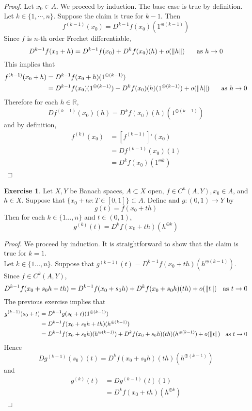 \documentclass[12pt]{amsart}
\theoremstyle{definition}
\newtheorem{ex}[definition]{Exercise}
\newcommand{\R}{\mathbb{R}}
\begin{document}
	\begin{proof}
	Let $x_0 \in A$. We proceed by induction. The base case is true by definition. Let $k \in \{1, \cdots, n\}$. Suppose the claim is true for $k-1$. Then $$f^{(k-1)}(x_0) = D^{k-1}f(x_0)(1^{\oplus (k-1)})$$
	Since $f$ is $n$-th order Frechet differentiable, $$D^{k-1}f(x_0+h) = D^{k-1}f(x_0) + D^kf(x_0)(h) + o(\|h\|) \hspace{.5cm} \text{ as } h \rightarrow 0$$ 
	This implies that 
	\begin{align*}
	f^{(k-1)}(x_0+h) 
	&=  D^{k-1}f(x_0+h)(1^{\oplus (k-1)}) \\
	&= D^{k-1}f(x_0)(1^{\oplus (k-1)}) + D^kf(x_0)(h)(1^{\oplus (k-1)}) + o(\|h\|) \hspace{.5cm} \text{ as } h \rightarrow 0
	\end{align*}
	Therefore for each $h \in \R$, $$Df^{(k-1)}(x_0)(h) = D^kf(x_0)(h)(1^{\oplus (k-1)})$$
	and by definition,
	\begin{align*}
	f^{(k)}(x_0) 
	&= [f^{(k-1)}]'(x_0) \\
	&= Df^{(k-1)}(x_0)(1) \\
	&=  D^kf(x_0)(1^{\oplus k})
	\end{align*}
	\end{proof}
	
	
	
	
	\begin{ex}
	Let $X,Y$ be Banach spaces, $A \subset X$ open, $f \in C^n(A, Y), x_0 \in A$, and $h \in X$. Suppose that $\{x_0 +tx:T \in [0,1]\} \subset A$. Define and $g:(0,1) \rightarrow Y$ by $$g(t) = f(x_0 + th)$$
	Then for each $k \in \{1 \dots, n\}$ and $t \in (0,1)$, $$g^{(k)}(t) = D^kf(x_0 + th)(h^{\oplus k})$$
	\end{ex}
	
	\begin{proof}
	We proceed by induction. It is straightforward to show that the claim is true for $k=1$.\\
	Let $k \in \{1 \dots, n\}$. Suppose that $g^{(k-1)}(t) = D^{k-1}f(x_0 + th)(h^{\oplus (k-1)})$. Since $f \in C^k(A, Y)$, $$D^{k-1}f(x_0 + s_0h + th)= D^{k-1}f(x_0 + s_0h) + D^k f(x_0 + s_0h)(th) + o(\|t\|) \hspace{.2cm} \text{ as }t \rightarrow 0 $$ 
	The previous exercise implies that 
	\begin{align*}
	g^{(k-1)}(s_0 + t)
	&= D^{k-1}g(s_0+t)(1^{\oplus (k-1)}) \\
	&= D^{k-1}f(x_0 + s_0h + th)(h^{\oplus (k-1)}) \\
	&= D^{k-1}f(x_0 + s_0h)(h^{\oplus (k-1)}) + D^kf(x_0 + s_0h)(th)(h^{\oplus (k-1)}) + o(\|t\|) \hspace{.2cm} \text{ as }t \rightarrow 0
	\end{align*}
	Hence $$Dg^{(k-1)}(s_0)(t) = D^kf(x_0 + s_0h)(th)(h^{\oplus (k-1)})$$ 
	and 
	\begin{align*}
	g^{(k)}(t)
	&= Dg^{(k-1)}(t)(1) \\
	&= D^kf(x_0 + th)(h^{\oplus k})
	\end{align*}
	\end{proof}
	
\end{document}
